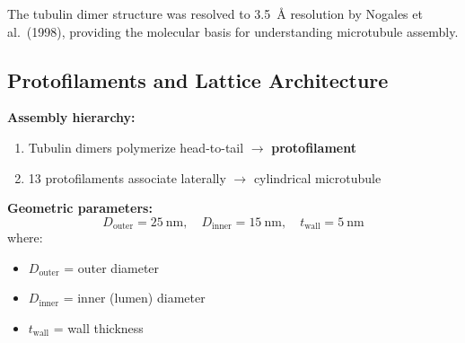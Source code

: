 The tubulin dimer structure was resolved to 3.5~Å resolution by Nogales et al.~(1998), providing the molecular basis for understanding microtubule assembly.

\subsection{Protofilaments and Lattice Architecture}

\textbf{Assembly hierarchy:}
\begin{enumerate}
\item Tubulin dimers polymerize head-to-tail $\rightarrow$ \textbf{protofilament}
\item 13 protofilaments associate laterally $\rightarrow$ cylindrical microtubule
\end{enumerate}

\textbf{Geometric parameters:}
\begin{equation}
D_{\mathrm{outer}} = 25\ \mathrm{nm}, \quad D_{\mathrm{inner}} = 15\ \mathrm{nm}, \quad t_{\mathrm{wall}} = 5\ \mathrm{nm}
\end{equation}
where:
\begin{itemize}
\item $D_{\mathrm{outer}}$ = outer diameter
\item $D_{\mathrm{inner}}$ = inner (lumen) diameter
\item $t_{\mathrm{wall}}$ = wall thickness
\end{itemize}

\begin{center}
\end{center}

